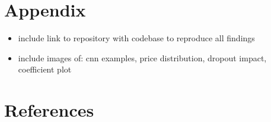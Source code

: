 \documentclass[12pt, letterpaper]{article}
\begin{document}

\section{Appendix}
\begin{itemize}
    \item include link to repository with codebase to reproduce all findings
    \item include images of: cnn examples, price distribution, dropout impact, coefficient plot
\end{itemize}


\section{References}
\end{document}
